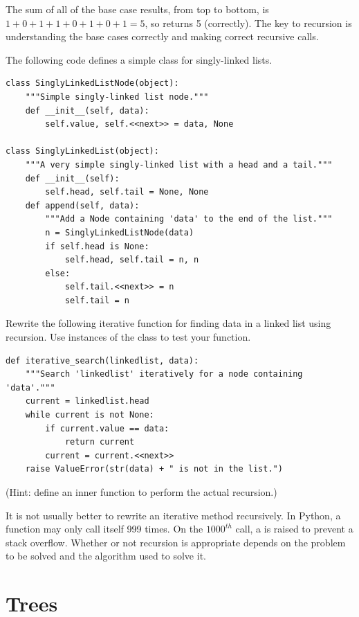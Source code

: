 The sum of all of the base case results, from top to bottom, is $1 + 0 + 1 + 1 + 0 + 1 + 0 + 1 = 5$, so  returns 5 (correctly).
The key to recursion is understanding the base cases correctly and making correct recursive calls.

\begin{problem}
The following code defines a simple class for singly-linked lists.
\begin{lstlisting}
class SinglyLinkedListNode(object):
    """Simple singly-linked list node."""
    def __init__(self, data):
        self.value, self.<<next>> = data, None

class SinglyLinkedList(object):
    """A very simple singly-linked list with a head and a tail."""
    def __init__(self):
        self.head, self.tail = None, None
    def append(self, data):
        """Add a Node containing 'data' to the end of the list."""
        n = SinglyLinkedListNode(data)
        if self.head is None:
            self.head, self.tail = n, n
        else:
            self.tail.<<next>> = n
            self.tail = n
\end{lstlisting}
Rewrite the following iterative function for finding data in a linked list using recursion.
Use instances of the  class to test your function.
\begin{lstlisting}
def iterative_search(linkedlist, data):
    """Search 'linkedlist' iteratively for a node containing 'data'."""
	current = linkedlist.head
	while current is not None:
		if current.value == data:
			return current
		current = current.<<next>>
	raise ValueError(str(data) + " is not in the list.")
\end{lstlisting}
(Hint: define an inner function to perform the actual recursion.)
\label{prob:recursion}
\end{problem}

\begin{warn}
It is not usually better to rewrite an iterative method recursively.
In Python, a function may only call itself 999 times.
On the $1000^{th}$ call, a  is raised to prevent a stack overflow.
Whether or not recursion is appropriate depends on the problem to be solved and the algorithm used to solve it.
\end{warn}

\section*{Trees}

